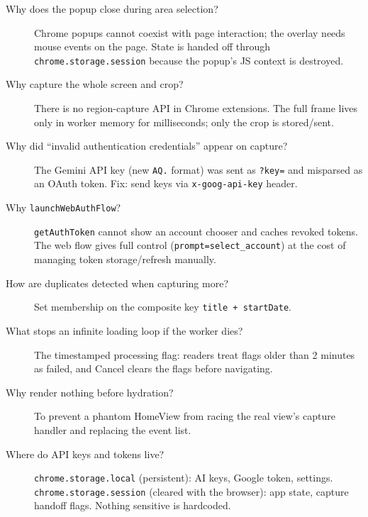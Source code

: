 \documentclass[11pt]{article}
\begin{document}
\begin{description}
  \item[Why does the popup close during area selection?] Chrome popups cannot
        coexist with page interaction; the overlay needs mouse events on the
        page. State is handed off through \texttt{chrome.storage.session}
        because the popup's JS context is destroyed.
  \item[Why capture the whole screen and crop?] There is no region-capture
        API in Chrome extensions. The full frame lives only in worker memory
        for milliseconds; only the crop is stored/sent.
  \item[Why did ``invalid authentication credentials'' appear on capture?]
        The Gemini API key (new \texttt{AQ.} format) was sent as
        \texttt{?key=} and misparsed as an OAuth token. Fix: send keys via
        \texttt{x-goog-api-key} header.
  \item[Why \texttt{launchWebAuthFlow}?] \texttt{getAuthToken} cannot show an
        account chooser and caches revoked tokens. The web flow gives full
        control (\texttt{prompt=select\_account}) at the cost of managing
        token storage/refresh manually.
  \item[How are duplicates detected when capturing more?] Set membership on
        the composite key \texttt{title + startDate}.
  \item[What stops an infinite loading loop if the worker dies?] The
        timestamped processing flag: readers treat flags older than 2
        minutes as failed, and Cancel clears the flags before navigating.
  \item[Why render nothing before hydration?] To prevent a phantom HomeView
        from racing the real view's capture handler and replacing the event
        list.
  \item[Where do API keys and tokens live?] \texttt{chrome.storage.local}
        (persistent): AI keys, Google token, settings.
        \texttt{chrome.storage.session} (cleared with the browser): app
        state, capture handoff flags. Nothing sensitive is hardcoded.
\end{description}
\end{document}
